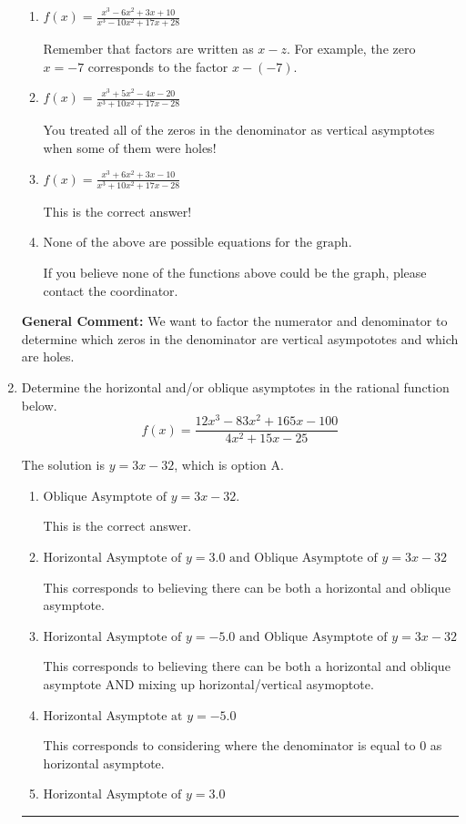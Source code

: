\documentclass{extbook}[14pt]
\newcommand{\litem}[1]{\item #1

\rule{\textwidth}{0.4pt}}
\begin{document}
\begin{enumerate}
{\begin{enumerate}[label=\Alph*.]
You treated all of the zeros in the denominator as vertical asmptotes when some of them were holes and wrote factors as $x+z$.
\item \( f(x)=\frac{x^{3} -6 x^{2} +3 x + 10}{x^{3} -10 x^{2} +17 x + 28} \)

Remember that factors are written as $x-z$. For example, the zero $x=-7$ corresponds to the factor $x-(-7)$.
\item \( f(x)=\frac{x^{3} +5 x^{2} -4 x -20}{x^{3} +10 x^{2} +17 x -28} \)

You treated all of the zeros in the denominator as vertical asymptotes when some of them were holes!
\item \( f(x)=\frac{x^{3} +6 x^{2} +3 x -10}{x^{3} +10 x^{2} +17 x -28} \)

This is the correct answer!
\item \( \text{None of the above are possible equations for the graph.} \)

If you believe none of the functions above could be the graph, please contact the coordinator.
\end{enumerate}

\textbf{General Comment:} We want to factor the numerator and denominator to determine which zeros in the denominator are vertical asympototes and which are holes.
}
\litem{
Determine the horizontal and/or oblique asymptotes in the rational function below.
\[ f(x) = \frac{12x^{3} -83 x^{2} +165 x -100}{4x^{2} +15 x -25} \]

The solution is \( y = 3x -32 \), which is option A.\begin{enumerate}[label=\Alph*.]
\item \( \text{Oblique Asymptote of } y = 3x -32. \)

This is the correct answer.
\item \( \text{Horizontal Asymptote of } y = 3.0 \text{ and Oblique Asymptote of } y = 3x -32 \)

This corresponds to believing there can be both a horizontal and oblique asymptote.
\item \( \text{Horizontal Asymptote of } y = -5.0 \text{ and Oblique Asymptote of } y = 3x -32 \)

This corresponds to believing there can be both a horizontal and oblique asymptote AND mixing up horizontal/vertical asymoptote.
\item \( \text{Horizontal Asymptote at } y = -5.0 \)

This corresponds to considering where the denominator is equal to 0 as horizontal asymptote.
\item \( \text{Horizontal Asymptote of } y = 3.0  \)


\end{enumerate}}
\end{enumerate}
\end{document}
